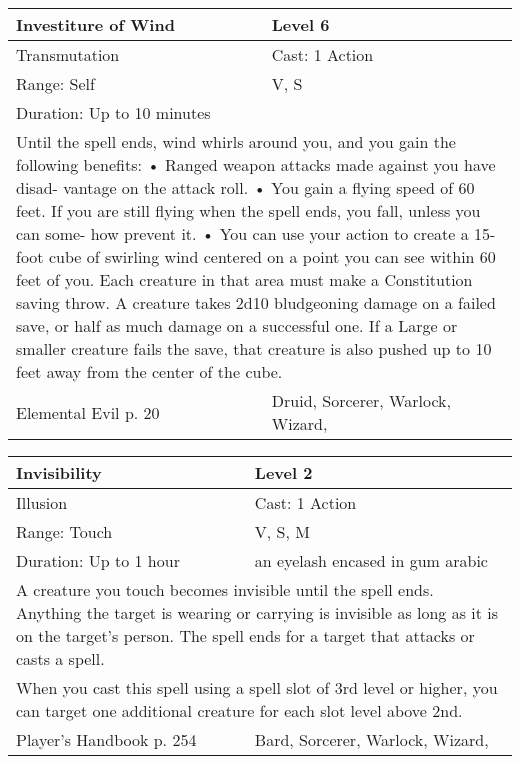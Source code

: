 \documentclass[11pt]{report}
\begin{document}
\begin{table}[H]
	\begin{tabular}{||p{6cm}|p{6cm}||}
		\hline\hline
		\bf{Investiture of Wind} & Level 6\\ \hline
		Transmutation & Cast: 1 Action\\ \hline
		Range: Self & V, S\\ \hline
		Duration: Up to 10 minutes & \\ \hline
		\multicolumn{2}{||p{12cm}||}{Until the spell ends, wind whirls around you, and you gain the following benefits:
• Ranged weapon attacks made against you have disad- vantage on the attack roll.
• You gain a flying speed of 60 feet. If you are still flying when the spell ends, you fall, unless you can some- how prevent it.
• You can use your action to create a 15-foot cube of swirling wind centered on a point you can see within 60 feet of you. Each creature in that area must make a Constitution saving throw. A creature takes 2d10 bludgeoning damage on a failed save, or half as much damage on a successful one. If a Large or smaller creature fails the save, that creature is also pushed up to 10 feet away from the center of the cube.}\\ \hline
Elemental Evil p. 20 & Druid, Sorcerer, Warlock, Wizard, \\ \hline\hline
	\end{tabular}
\end{table}

\begin{table}[H]
	\begin{tabular}{||p{6cm}|p{6cm}||}
		\hline\hline
		\bf{Invisibility} & Level 2\\ \hline
		Illusion & Cast: 1 Action\\ \hline
		Range: Touch & V, S, M\\ \hline
		Duration: Up to 1 hour & an eyelash encased in gum arabic\\ \hline
		\multicolumn{2}{||p{12cm}||}{A creature you touch becomes invisible until the spell ends. Anything the target is wearing or carrying is invisible as long as it is on the target’s person. The spell ends for a target that attacks or casts a spell.}\\ \hline
		\multicolumn{2}{||p{12cm}||}{When you cast this spell using a spell slot of 3rd level or higher, you can target one additional creature for each slot level above 2nd.}\\ \hline
Player's Handbook p. 254 & Bard, Sorcerer, Warlock, Wizard, \\ \hline\hline
	\end{tabular}
\end{table}
\end{document}
